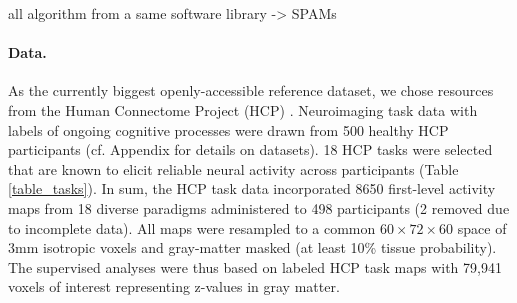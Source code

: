 \documentclass{article} %
\begin{document}
all algorithm from a same software library -> SPAMs

%
\paragraph{Data.}
As the currently biggest openly-accessible reference dataset,
we chose resources from the Human Connectome Project (HCP)
\cite{barch2013}.
Neuroimaging task data with labels of ongoing cognitive processes
were drawn from 500
healthy HCP participants (cf. Appendix for details on datasets).
18 HCP tasks 
were selected that are known to elicit reliable neural activity
across participants (Table \ref{table_tasks}).
In sum, the HCP task data incorporated 8650 first-level activity maps
from 18 diverse paradigms administered to 498 participants (2 removed
due to incomplete data).
All maps were resampled to a common $60\times72\times60$ space of
3mm isotropic voxels and gray-matter masked (at least 10\% tissue
probability).
The supervised analyses were thus based on labeled HCP task maps with
79,941 voxels of interest representing z-values in gray matter.
\end{document}
